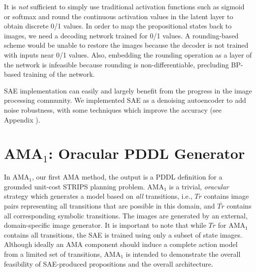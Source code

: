 \documentclass[11pt]{article}
\begin{document}

It is {\it not} sufficient to simply use traditional activation functions such as sigmoid or softmax and round the continuous activation values in the latent layer to obtain discrete 0/1 values.
In order to map the propositional states back to images,
we need a decoding network trained for 0/1 values.
A rounding-based scheme would be unable to restore the images because the decoder is not trained with inputs near 0/1 values.
Also, embedding the rounding operation as a layer of the network is infeasible because rounding is non-differentiable, precluding BP-based training of the network.


SAE implementation can easily and largely benefit from the progress in the image processing community.
We implemented SAE as a denoising autoencoder \cite{vincent2008extracting} to add noise robustness,
with some techniques which improve the accuracy (see Appendix ).


\section{AMA$_1$: Oracular PDDL Generator}
\label{sec:ama1-overview}

In AMA$_1$, our first AMA method, the output is a PDDL definition for a grounded unit-cost STRIPS planning problem.
AMA$_1$ is a trivial, \emph{oracular} strategy which generates a model based on \emph{all} transitions, i.e., 
$Tr$ contains image pairs representing all transitions that are possible in this domain, and
$\overline{Tr}$ contains all corresponding symbolic transitions.
The images are generated by an external, domain-specific image generator.
It is important to note that while $Tr$ for AMA$_1$ contains all transitions, the SAE is trained using only a subset of state images.
Although ideally an AMA component should induce a complete action model from a limited set of transitions,
AMA$_1$ is intended to demonstrate the overall feasibility of SAE-produced propositions and the overall \latentplanner architecture.
\end{document}
